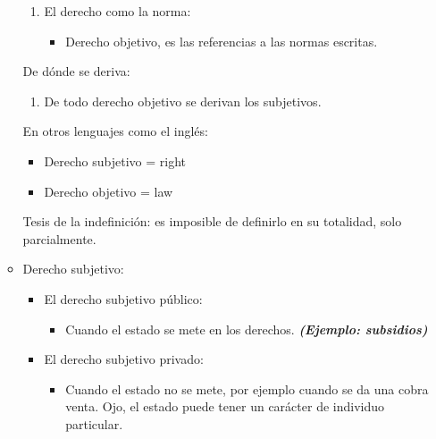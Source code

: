 \begin{itemize}
\begin{itemize}
\begin{enumerate}
            \item El derecho como la norma:
            \begin{itemize}
                \item Derecho objetivo, es las referencias a las normas escritas.
            \end{itemize}
        \end{enumerate} 
        
        De dónde se deriva:
        \begin{enumerate}
            \item De todo derecho objetivo se derivan los subjetivos.
        \end{enumerate}
        
        En otros lenguajes como el inglés:
        \begin{itemize}
            \item Derecho subjetivo = right 
            \item Derecho objetivo = law
        \end{itemize}

        Tesis de la indefinición: es imposible de definirlo en su totalidad, solo parcialmente. 

        
        \item Derecho subjetivo:
        \begin{itemize}
            \item El derecho subjetivo público:
            \begin{itemize}
                \item Cuando el estado se mete en los derechos. \textbf{\emph{(Ejemplo: subsidios)}}
            \end{itemize}
            
            \item El derecho subjetivo privado:
            \begin{itemize}
                \item Cuando el estado no se mete, por ejemplo cuando se da una cobra venta. Ojo, el estado puede tener un carácter de individuo particular.
            \end{itemize}
            
            
        \end{itemize}
    \end{itemize}
        


\end{itemize}
